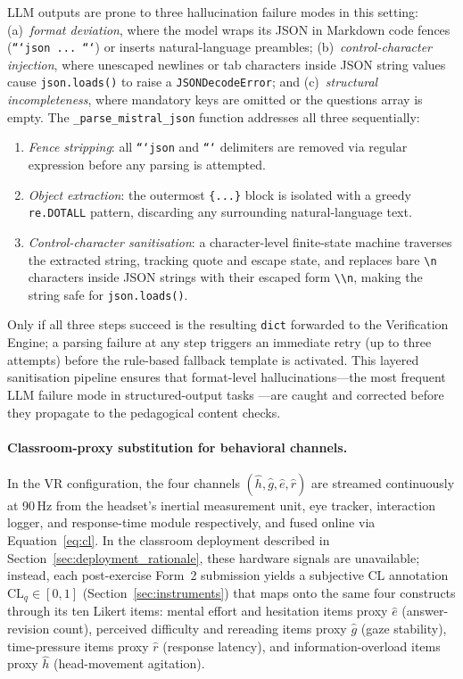 \documentclass[ASNA,twocolumn]{USG} %
\begin{document}
LLM outputs are prone to three hallucination failure modes in this
setting: (a)~\emph{format deviation}, where the model wraps its
JSON in Markdown code fences (\texttt{```json ... ```}) or
inserts natural-language preambles; (b)~\emph{control-character
injection}, where unescaped newlines or tab characters inside
JSON string values cause \texttt{json.loads()} to raise a
\texttt{JSONDecodeError}; and (c)~\emph{structural incompleteness},
where mandatory keys are omitted or the questions array is empty.
The \texttt{\_parse\_mistral\_json} function addresses all three
sequentially:
\begin{enumerate}
  \item \emph{Fence stripping}: all \texttt{```json} and
        \texttt{```} delimiters are removed via regular expression
        before any parsing is attempted.
  \item \emph{Object extraction}: the outermost
        \texttt{\{...\}} block is isolated with a greedy
        \texttt{re.DOTALL} pattern, discarding any surrounding
        natural-language text.
  \item \emph{Control-character sanitisation}: a character-level
        finite-state machine traverses the extracted string,
        tracking quote and escape state, and replaces bare
        \texttt{\textbackslash n} characters inside JSON strings
        with their escaped form \texttt{\textbackslash\textbackslash n},
        making the string safe for \texttt{json.loads()}.
\end{enumerate}
Only if all three steps succeed is the resulting \texttt{dict}
forwarded to the Verification Engine; a parsing failure at any
step triggers an immediate retry (up to three attempts) before
the rule-based fallback template is activated.
This layered sanitisation pipeline ensures that format-level
hallucinations---the most frequent LLM failure mode in
structured-output tasks \cite{Longo2024}---are caught and
corrected before they propagate to the pedagogical content checks.

\paragraph{Classroom-proxy substitution for behavioral channels.}
In the VR configuration, the four channels
$(\hat{h}, \hat{g}, \hat{e}, \hat{r})$ are streamed continuously
at 90\,Hz from the headset's inertial measurement unit, eye tracker,
interaction logger, and response-time module respectively, and fused
online via Equation~\eqref{eq:cl}.
In the classroom deployment described in
Section~\ref{sec:deployment_rationale}, these hardware signals are
unavailable; instead, each post-exercise Form~2 submission yields a
subjective CL annotation $\text{CL}_q \in [0,1]$
(Section~\ref{sec:instruments}) that maps onto the same four
constructs through its ten Likert items:
mental effort and hesitation items proxy $\hat{e}$
(answer-revision count), perceived difficulty and rereading items
proxy $\hat{g}$ (gaze stability), time-pressure items proxy $\hat{r}$
(response latency), and information-overload items proxy $\hat{h}$
(head-movement agitation).
\end{document}
